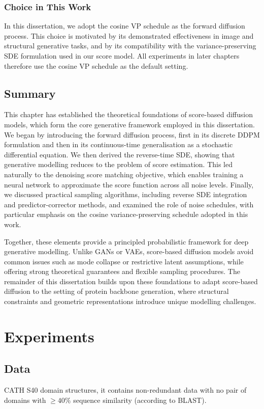 \documentclass[12pt]{report}
\begin{document}
\subsection*{Choice in This Work}
In this dissertation, we adopt the cosine VP schedule as the forward diffusion process. This choice is motivated by its demonstrated effectiveness in image and structural generative tasks, and by its compatibility with the variance-preserving SDE formulation used in our score model. All experiments in later chapters therefore use the cosine VP schedule as the default setting.

\section{Summary}
This chapter has established the theoretical foundations of score-based diffusion models, which form the core generative framework employed in this dissertation. We began by introducing the forward diffusion process, first in its discrete DDPM formulation and then in its continuous-time generalisation as a stochastic differential equation. We then derived the reverse-time SDE, showing that generative modelling reduces to the problem of score estimation. This led naturally to the denoising score matching objective, which enables training a neural network to approximate the score function across all noise levels. Finally, we discussed practical sampling algorithms, including reverse SDE integration and predictor-corrector methods, and examined the role of noise schedules, with particular emphasis on the cosine variance-preserving schedule adopted in this work.

Together, these elements provide a principled probabilistic framework for deep generative modelling. Unlike GANs or VAEs, score-based diffusion models avoid common issues such as mode collapse or restrictive latent assumptions, while offering strong theoretical guarantees and flexible sampling procedures. The remainder of this dissertation builds upon these foundations to adapt score-based diffusion to the setting of protein backbone generation, where structural constraints and geometric representations introduce unique modelling challenges.

\chapter{Experiments}\label{chapter:Experiments}
\section{Data}
CATH S40 domain structures, it contains non-redundant data with no pair of domains with \(\geq 40\%\) sequence similarity (according to BLAST).
\end{document}
